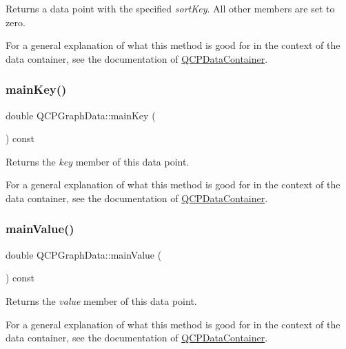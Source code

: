 Returns a data point with the specified {\itshape sort\+Key}. All other members are set to zero.

For a general explanation of what this method is good for in the context of the data container, see the documentation of \mbox{\hyperlink{class_q_c_p_data_container}{Q\+C\+P\+Data\+Container}}. \mbox{\label{class_q_c_p_graph_data_a72fdaf738f679ef93bea3d552ba42d1b}} 
\subsubsection{\texorpdfstring{main\+Key()}{mainKey()}}
{\footnotesize\ttfamily double Q\+C\+P\+Graph\+Data\+::main\+Key (\begin{DoxyParamCaption}{ }\end{DoxyParamCaption}) const\hspace{0.3cm}{\ttfamily [inline]}}

Returns the {\itshape key} member of this data point.

For a general explanation of what this method is good for in the context of the data container, see the documentation of \mbox{\hyperlink{class_q_c_p_data_container}{Q\+C\+P\+Data\+Container}}. \mbox{\label{class_q_c_p_graph_data_a1b1e440a430a4a83d9a3f6f247510f27}} 
\subsubsection{\texorpdfstring{main\+Value()}{mainValue()}}
{\footnotesize\ttfamily double Q\+C\+P\+Graph\+Data\+::main\+Value (\begin{DoxyParamCaption}{ }\end{DoxyParamCaption}) const\hspace{0.3cm}{\ttfamily [inline]}}

Returns the {\itshape value} member of this data point.

For a general explanation of what this method is good for in the context of the data container, see the documentation of \mbox{\hyperlink{class_q_c_p_data_container}{Q\+C\+P\+Data\+Container}}. \mbox{\label{class_q_c_p_graph_data_a5e0f37ea101eeec245d8c32a2206b204}} 
